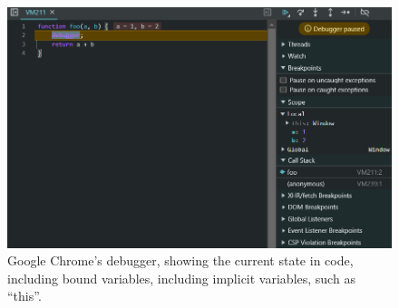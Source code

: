 \begin{figure}[t]
    \centering
    \includegraphics[width=1\linewidth]{chapters/2-background/figures/debugger.png}
    \caption{Google Chrome's debugger, showing the current state in code, including bound variables, including implicit variables, such as ``this''.}
    \label{fig:chrome}
\end{figure}